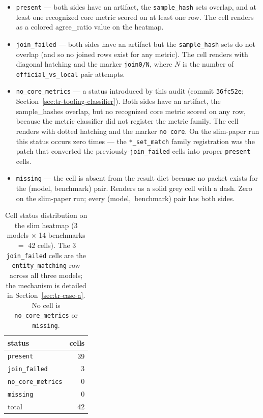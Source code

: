\documentclass[11pt]{article}
\begin{document}
\begin{itemize}
  \item \texttt{present} --- both sides have an artifact, the
        \texttt{sample\_hash} sets overlap, and at least one
        recognized core metric scored on at least one row.
        The cell renders as a colored agree\_ratio value on the
        heatmap.
  \item \texttt{join\_failed} --- both sides have an artifact but the
        \texttt{sample\_hash} sets do not overlap (and so no joined
        rows exist for any metric).
        The cell renders with diagonal hatching and the marker
        \texttt{join0/N}, where $N$ is the number of
        \texttt{official\_vs\_local} pair attempts.
  \item \texttt{no\_core\_metrics} --- a status introduced by this
        audit (commit \texttt{36fc52e};
        Section~\ref{sec:tr-tooling-classifier}).
        Both sides have an artifact, the sample\_hashes overlap, but
        no recognized core metric scored on any row, because the
        metric classifier did not register the metric family.
        The cell renders with dotted hatching and the marker
        \texttt{no core}.
        On the slim-paper run this status occurs zero times --- the
        \texttt{*\_set\_match} family registration was the patch
        that converted the previously-\texttt{join\_failed}
         cells into proper
        \texttt{present} cells.
  \item \texttt{missing} --- the cell is absent from the result dict
        because no packet exists for the (model, benchmark) pair.
        Renders as a solid grey cell with a dash.
        Zero on the slim-paper run; every \mbox{(model, benchmark)}
        pair has both sides.
\end{itemize}

\begin{table}[htbp]
\centering
\small
\caption{Cell status distribution on the slim heatmap (3 models
  $\times$ 14 benchmarks $=$ 42 cells).
The 3 \texttt{join\_failed} cells are the
  \texttt{entity\_matching} row across all three models; the
  mechanism is detailed in Section~\ref{sec:tr-case-a}.
No cell is \texttt{no\_core\_metrics} or \texttt{missing}.}
\label{tab:tr-cell-status}
\begin{tabular}{lr}
\toprule
status & cells \\
\midrule
\texttt{present}            & 39 \\
\texttt{join\_failed}       &  3 \\
\texttt{no\_core\_metrics}  &  0 \\
\texttt{missing}            &  0 \\
\midrule
total                       & 42 \\
\bottomrule
\end{tabular}
\end{table}
\end{document}
